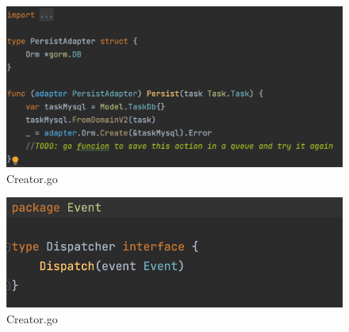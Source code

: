\begin{figure}[H]
    \centering
    \includegraphics[height=0.2\textheight]{./part/Ejecucion/Seguimiento/CreateTaskUseCase/img/PFM - SaveAdapter}
    \caption{Creator.go}\label{fig:SaveAdapter}
\end{figure}

\begin{figure}[H]
    \centering
    \includegraphics[height=0.2\textheight]{./part/Ejecucion/Seguimiento/CreateTaskUseCase/img/PFM - Dispatcher}
    \caption{Creator.go}\label{fig:DispatcherPort}
\end{figure}